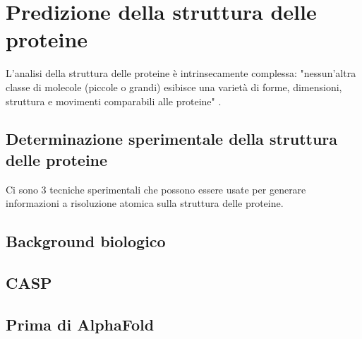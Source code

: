 \chapter{Predizione della struttura delle proteine}
L'analisi della struttura delle proteine è intrinsecamente complessa: "nessun'altra classe di molecole (piccole o grandi) esibisce una varietà di forme, dimensioni, struttura e movimenti comparabili alle proteine"  \parencite{baxevanis2020bioinformatics}.

\section{Determinazione sperimentale della struttura delle proteine}

Ci sono 3 tecniche sperimentali che possono essere usate per generare informazioni a risoluzione atomica sulla struttura delle proteine.


\section{Background biologico}
\section{CASP}
\section{Prima di AlphaFold}

\clearpage